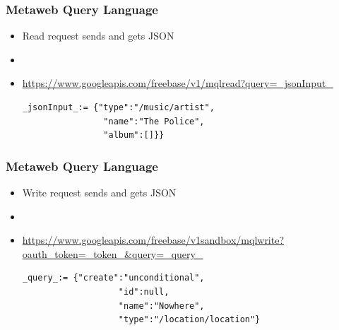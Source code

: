 \begin{frame}[fragile]
\frametitle{Metaweb Query Language}
\begin{itemize}
  \item Read request sends and gets JSON
  \item[]
  \item
  \url{https://www.googleapis.com/freebase/v1/mqlread?query=\_jsonInput\_}\\
    \begin{verbatim}_jsonInput_:= {"type":"/music/artist",
  	            "name":"The Police",
  	            "album":[]}} 
\end{verbatim}
\end{itemize}
\end{frame}



\begin{frame}[fragile]
\frametitle{Metaweb Query Language}
\begin{itemize}
  \item Write request sends and gets JSON
  \item[]
  \item
  \url{https://www.googleapis.com/freebase/v1sandbox/mqlwrite?oauth_token=_token_&query=_query_}\\
    \begin{verbatim}_query_:= {"create":"unconditional",
		           "id":null,
		           "name":"Nowhere",
		           "type":"/location/location"} 
\end{verbatim}
\end{itemize}
\end{frame}
